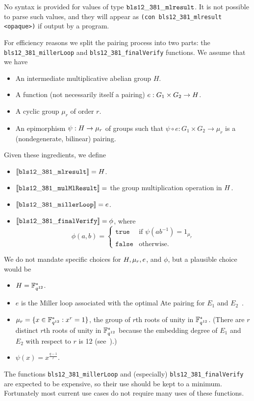 No syntax is provided for values of type $\mathtt{bls12\_381\_mlresult}$. It is not
possible to parse such values, and they will appear as \texttt{(con
bls12\_381\_mlresult <opaque>)} if output by a program.


\label{note:pairing}
For efficiency reasons we split the pairing process into two parts:
the \texttt{bls12\_381\_millerLoop} and \texttt{bls12\_381\_finalVerify}
functions.  We assume that we have
\begin{itemize}
\item An intermediate multiplicative abelian group $H$.
\item A function (not necessarily itself a pairing) $e: G_1 \times
G_2 \rightarrow H$.
\item A cyclic group $\mu_r$ of order $r$.
\item An epimorphism $\psi: H \rightarrow \mu_r$ of groups such
that $\psi \circ e: G_1 \times G_2 \rightarrow \mu_r$ is a (nondegenerate,
bilinear) pairing.
\end{itemize}

\noindent Given these ingredients, we define
\begin{itemize}
\item $\llbracket\mathit{\mathtt{bls12\_381\_mlresult}}\rrbracket = H$.
\item $\llbracket\mathit{\mathtt{bls12\_381\_mulMlResult}}\rrbracket =$
the group multiplication operation in $H$.
\item $\llbracket\mathit{\mathtt{bls12\_381\_millerLoop}}\rrbracket = e$.
\item $\llbracket\mathit{\mathtt{bls12\_381\_finalVerify}}\rrbracket = \phi$,
where
$$
\phi(a,b) = \begin{cases}
               \mathtt{true} & \text{if $\psi(ab^{-1}) = 1_{\mu_r}$} \\
               \mathtt{false} & \text{otherwise.}
            \end{cases}
$$
\end{itemize}

\medskip
\noindent
We do not mandate specific choices for $H, \mu_r, e$, and $\phi$, but a
plausible choice would be
\begin{itemize}
\item $H = \mathbb{F}_{q^{12}}^*$.
\item $e$ is the Miller loop associated with the optimal Ate pairing
for $E_1$ and $E_2$~\cite{Vercauteren}.
\item $\mu_r = \{x \in \mathbb{F}_{q^{12}}^*: x^r=1\}$, the group of $r$th roots of unity in $\mathbb{F}_{q^{12}}^*$.
(There are $r$ distinct $r$th roots of unity in $\mathbb{F}_{q^{12}}^*$ because the embedding
degree of $E_1$ and $E_2$ with respect to $r$ is 12 (see~\cite[4.1]{Costello-pairings}).)
\item $\psi(x) = x^{\frac{q-1}{r}}$.
\end{itemize}

\noindent The functions \texttt{bls12\_381\_millerLoop} and (especially)
\texttt{bls12\_381\_finalVerify} are expected
to be expensive, so their use should be kept to a minimum.  Fortunately most
current use cases do not require many uses of these functions.
